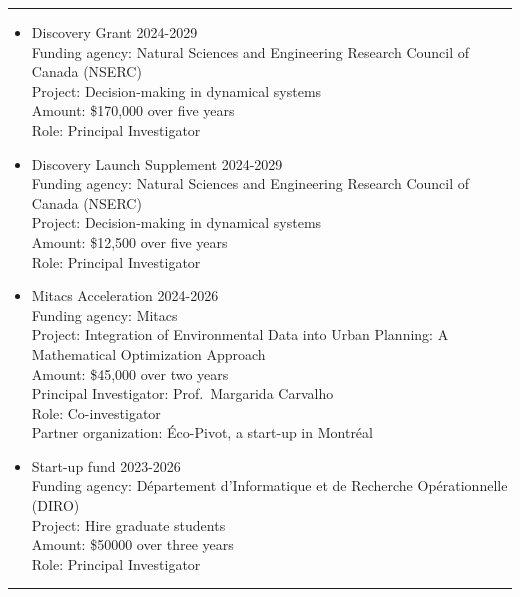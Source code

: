 \documentclass[12pt]{article}
\renewcommand{\section}[1]{
\vspace{0.25em}
\noindent{\normalfont\large\bfseries\color{black} #1}\par
\vspace{-0.24em}
\noindent\textcolor{black}{\rule{0.55\textwidth}{1.1pt}}
\vspace{0.48em}
}
\newenvironment{midlist}[1][\enskip\textbullet]%
        {\begin{itemize}[#1,leftmargin=*,parsep=0pt,itemsep=4pt,topsep=2pt,partopsep=0pt]}
        {\end{itemize}}
\begin{document}
\section{Grants}
\begin{midlist}
\item Discovery Grant \hfill{2024-2029}\\
Funding agency:  Natural Sciences and Engineering Research Council of Canada (NSERC)\\
Project: Decision-making in dynamical systems\\
Amount: \$170,000 over five years\\
Role: Principal Investigator
\item Discovery Launch Supplement \hfill{2024-2029}\\
Funding agency:  Natural Sciences and Engineering Research Council of Canada (NSERC)\\
Project: Decision-making in dynamical systems\\
Amount: \$12,500 over five years\\
Role: Principal Investigator
\item Mitacs Acceleration \hfill{2024-2026}\\
Funding agency:  Mitacs\\
Project: Integration of Environmental Data into Urban Planning: A
Mathematical Optimization Approach\\
Amount: \$45,000 over two years\\
Principal Investigator: Prof.~Margarida Carvalho\\
Role: Co-investigator\\ 
Partner organization:  Éco-Pivot, a start-up in Montréal 
\item Start-up fund \hfill{2023-2026}\\
Funding agency:  Département d’Informatique et de Recherche Opérationnelle (DIRO)\\
Project: Hire graduate students\\
Amount: \$50000 over three years\\
Role: Principal Investigator
\end{midlist}


\section{Journal Papers}
\label{sec:pubs}
\begin{enumerate}[label=\textbf{[J\arabic*]}]
\item  {}
\vspace{2mm}
\item {}
\vspace{2mm}
\item {}
\vspace{2mm}
\item {}
\vspace{2mm}
\item {}
\item {}
\end{enumerate}
\end{document}
